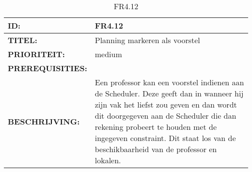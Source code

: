 \noindent\begin{table}[h]
            \begin{tabular}{l | p{10cm}}
                \textbf{ID:} & FR4.12 \\ \hline
                \textbf{TITEL:} & Planning markeren als voorstel\\ \hline
                \textbf{PRIORITEIT:} &  medium \\ \hline
                \textbf{PREREQUISITIES:} & \\ \hline
                \textbf{BESCHRIJVING:} & Een professor kan een voorstel indienen aan de Scheduler. 
                                        Deze geeft dan in wanneer hij zijn vak het liefst zou geven en dan wordt dit doorgegeven aan de Scheduler die dan rekening probeert te houden met de ingegeven constraint. Dit staat los van de beschikbaarheid van de professor en lokalen.  \\
            \end{tabular}\\
            \caption{FR4.12}
            \label{tab:FR4.12}
        \end{table}
        
\clearpage
        